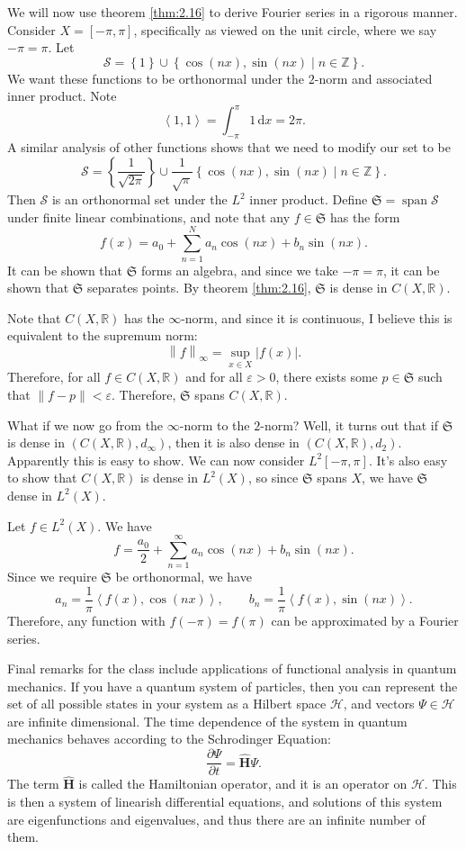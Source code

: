 \documentclass[11pt, letterpaper]{report}
\begin{document}
We will now use theorem \ref{thm:2.16} to derive Fourier series in a rigorous manner. Consider $X=[-\pi ,\pi ]$, specifically as viewed on the unit circle, where we say $-\pi =\pi $. Let
\[
	\mathscr{S} =\left\{ 1 \right\} \cup \left\{ \cos (nx),\sin (nx) \mid n\in\mathbb{Z} \right\} 
.\]
We want these functions to be orthonormal under the $2$-norm and associated inner product. Note
\[
	\left\langle 1,1 \right\rangle =\int_{-\pi }^{\pi } 1 \,\mathrm{d} x=2\pi 
.\]
A similar analysis of other functions shows that we need to modify our set to be
\[
	\mathscr{S} =\left\{ \frac{1}{\sqrt{2\pi } } \right\} \cup \frac{1}{\sqrt{\pi } }\left\{ \cos (nx),\sin (nx) \mid n\in\mathbb{Z} \right\} 
.\]
Then $\mathscr{S} $ is an orthonormal set under the $L^2$ inner product. Define $\mathfrak{S} =\operatorname{span}\mathscr{S}  $ under finite linear combinations, and note that any $f\in \mathfrak{S} $ has the form
\[
	f(x)=a_0+\sum_{n=1}^{N} a_n\cos (nx)+b_n\sin (nx)
.\]
It can be shown that $\mathfrak{S} $ forms an algebra, and since we take $-\pi=\pi $, it can be shown that $\mathfrak{S} $ separates points. By theorem \ref{thm:2.16}, $\mathfrak{S} $ is dense in $C(X,\mathbb{R})$.

Note that $C(X,\mathbb{R})$ has the $\infty$-norm, and since it is continuous, I believe this is equivalent to the supremum norm:
\[
	\left\lVert f \right\rVert_{\infty}=\sup_{x\in X}\left| f(x) \right| 
.\]
Therefore, for all $f\in C(X,\mathbb{R})$ and for all $\varepsilon >0$, there exists some $p\in \mathfrak{S} $ such that $\left\lVert f-p \right\rVert <\varepsilon $. Therefore, $\mathfrak{S} $ spans $C(X,\mathbb{R})$.

What if we now go from the $\infty$-norm to the $2$-norm? Well, it turns out that if $\mathfrak{S} $ is dense in $(C(X,\mathbb{R}),d_{\infty})$, then it is also dense in $(C(X,\mathbb{R}),d_2)$. Apparently this is easy to show. We can now consider $L^2[-\pi ,\pi ]$. It's also easy to show that $C(X,\mathbb{R})$ is dense in $L^2(X)$, so since $\mathfrak{S} $ spans $X$, we have $\mathfrak{S} $ dense in $L^2(X)$.

Let $f\in L^2(X)$. We have
\[
	f=\frac{a_0}{2}+\sum_{n=1}^{\infty} a_n\cos (nx)+b_n\sin (nx)
.\]
Since we require $\mathfrak{S} $ be orthonormal, we have
\[
	a_n=\frac{1}{\pi }\left\langle f(x),\cos (nx) \right\rangle ,\qquad b_n=\frac{1}{\pi }\left\langle f(x),\sin (nx) \right\rangle 
.\]
Therefore, any function with $f(-\pi )=f(\pi )$ can be approximated by a Fourier series.

Final remarks for the class include applications of functional analysis in quantum mechanics. If you have a quantum system of particles, then you can represent the set of all possible states in your system as a Hilbert space $\mathcal{H} $, and vectors $\Psi  \in \mathcal{H} $ are infinite dimensional. The time dependence of the system in quantum mechanics behaves according to the Schrodinger Equation:
\[
	\frac{\partial \Psi }{\partial t} =\mathbf{\hat{H}}\Psi 
.\]
The term $\mathbf{\hat{H}}$ is called the Hamiltonian operator, and it is an operator on $\mathcal{H} $. This is then a system of linearish differential equations, and solutions of this system are eigenfunctions and eigenvalues, and thus there are an infinite number of them.
\end{document}
